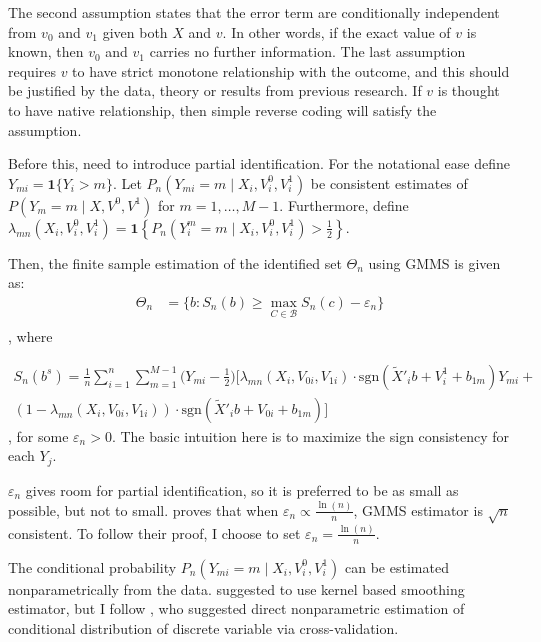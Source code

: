 \documentclass{article}
\begin{document}
The second assumption states that the error term are conditionally independent from $v_{0}$ and $v_{1}$ given both $X$ and $v$. In other words, if the exact value of $v$ is known, then $v_{0}$ and $v_{1}$ carries no further information. The last assumption requires $v$ to have strict monotone relationship with the outcome, and this should be justified by the data, theory or results from previous research. If $v$ is thought to have native relationship, then simple reverse coding will satisfy the assumption.

Before this, need to introduce partial identification.
For the notational ease define $Y_{mi} = \mathbf{1}\{Y_i > m\}$. Let $P_n(Y_{mi} = m \mid X_i, V^0_i, V^1_i)$ be consistent estimates of $P(Y_{m} = m \mid X, V^0, V^1)$ for $m = 1, \ldots, M - 1$. Furthermore, define $\lambda_{mn}(X_i, V^0_i, V^1_i) = \mathbf{1}\left\{P_n(Y^m_i = m \mid X_i, V^0_i, V^1_i) > \frac{1}{2} \right\}$. 

Then, the finite sample estimation of the identified set $\Theta_{n}$ using GMMS is given as:
\begin{equation}
    \begin{aligned}
        \Theta_n &= \{ b: S_{n}(b) \ge \max_{C \in \mathcal{B}} S_{n}(c) - \varepsilon_{n}\}\\
    \end{aligned}
\end{equation}
, where

\begin{multline}
    S_n(b^s) = \frac{1}{n} \sum_{i=1}^n \sum_{m=1}^{M-1} \biggl(Y_{mi} - \frac{1}{2}\biggl)  \biggl[ \lambda_{mn}(X_i, V_{0i}, V_{1i}) \cdot \text{sgn}(\tilde{X}'_i b + V^1_i + b_{1m}) Y_{mi} + \\ 
    (1 - \lambda_{mn}(X_i, V_{0i}, V_{1i})) \cdot \text{sgn}(\tilde{X}'_i b + V_{0i} + b_{1m}){\biggl]}
\end{multline}
, for some $\varepsilon_{n} > 0$. 
The basic intuition here is to maximize the sign consistency for each $Y_{j}$. 

$\varepsilon_{n}$ gives room for partial identification, so it is preferred to be as small as possible, but not to small. \citet{Chernozhukov2007a} proves that when $\varepsilon_{n} \propto \frac{\ln(n)}{n}$, GMMS estimator is $\sqrt{n}$ consistent. To follow their proof, I choose to set $\varepsilon_{n} = \frac{\ln(n)}{n}$. 

The conditional probability $P_n(Y_{mi} = m \mid X_i, V^0_i, V^1_i)$ can be estimated nonparametrically from the data. \citet{Wang2022a} suggested to use kernel based smoothing estimator, but I follow \citet{Hall2004a}, who suggested direct nonparametric estimation of conditional distribution of discrete variable via cross-validation. 
\end{document}
